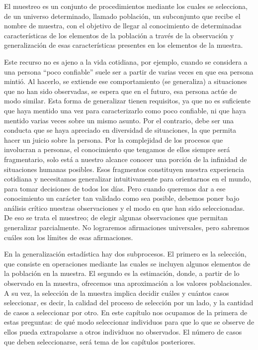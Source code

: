 \documentclass[]{book}
\begin{document}
El muestreo es un conjunto de procedimientos mediante los cuales se
selecciona, de un universo determinado, llamado población, un
subconjunto que recibe el nombre de muestra, con el objetivo de llegar
al conocimiento de determinadas características de los elementos de la
población a través de la observación y generalización de esas
características presentes en los elementos de la muestra.

Este recurso no es ajeno a la vida cotidiana, por ejemplo, cuando se
considera a una persona ``poco confiable'' suele ser a partir de varias
veces en que esa persona mintió. Al hacerlo, se extiende ese
comportamiento (se generaliza) a situaciones que no han sido observadas,
se espera que en el futuro, esa persona actúe de modo similar. Esta
forma de generalizar tienen requisitos, ya que no es suficiente que haya
mentido una vez para caracterizarlo como poco confiable, ni que haya
mentido varias veces sobre un mismo asunto. Por el contrario, debe ser
una conducta que se haya apreciado en diversidad de situaciones, la que permita hacer un juicio sobre la persona. Por la complejidad de los procesos que involucran a personas, el conocimiento que tengamos de ellos siempre será fragmentario, solo está a nuestro alcance conocer una porción de la infinidad de situaciones humanas posibles. Esos fragmentos constituyen nuestra experiencia cotidiana y necesitamos generalizar intuitivamente para orientarnos en el mundo, para tomar decisiones de todos los días. Pero cuando queremos dar a ese conocimiento un carácter tan validado como sea posible, debemos poner bajo análisis crítico nuestras observaciones y el modo en que han sido seleccionadas. De eso se trata el muestreo; de elegir algunas observaciones que permitan generalizar parcialmente. No lograremos afirmaciones universales, pero sabremos cuáles son los límites de esas afirmaciones.

En la generalización estadística hay dos subprocesos. El primero es la selección, que consiste en operaciones mediante las cuales se incluyen algunos elementos de la población en la muestra. El segundo es la estimación, donde, a partir de lo observado en la muestra, ofrecemos una aproximación a los valores poblacionales. A su vez, la selección de la muestra implica decidir cuáles y cuántos casos seleccionar, es decir, la calidad del proceso de selección por un lado, y la cantidad de casos a seleccionar por otro. En este capítulo nos ocupamos de la primera de estas preguntas: de qué modo seleccionar individuos para que lo que se observe de ellos pueda extrapolarse a otros individuos no observados. El número de casos que deben seleccionarse, será tema de los capítulos posteriores.
\end{document}
